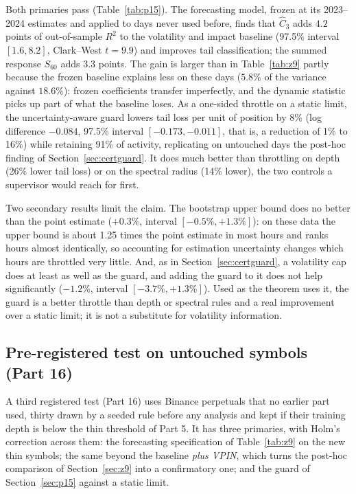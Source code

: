 Both primaries pass (Table~\ref{tab:p15}). The forecasting model, frozen at its 2023--2024 estimates and applied to days never used before, finds that $\hat C_3$ adds $4.2$ points of out-of-sample $R^2$ to the volatility and impact baseline (97.5\% interval $[1.6,8.2]$, Clark--West $t=9.9$) and improves tail classification; the summed response $S_{60}$ adds $3.3$ points. The gain is larger than in Table~\ref{tab:z9} partly because the frozen baseline explains less on these days ($5.8\%$ of the variance against $18.6\%$): frozen coefficients transfer imperfectly, and the dynamic statistic picks up part of what the baseline loses. As a one-sided throttle on a static limit, the uncertainty-aware guard lowers tail loss per unit of position by 8\% (log difference $-0.084$, 97.5\% interval $[-0.173,-0.011]$, that is, a reduction of 1\% to 16\%) while retaining 91\% of activity, replicating on untouched days the post-hoc finding of Section~\ref{sec:certguard}. It does much better than throttling on depth (26\% lower tail loss) or on the spectral radius (14\% lower), the two controls a supervisor would reach for first.

Two secondary results limit the claim. The bootstrap upper bound does no better than the point estimate ($+0.3\%$, interval $[-0.5\%,+1.3\%]$): on these data the upper bound is about 1.25 times the point estimate in most hours and ranks hours almost identically, so accounting for estimation uncertainty changes which hours are throttled very little. And, as in Section~\ref{sec:certguard}, a volatility cap does at least as well as the guard, and adding the guard to it does not help significantly ($-1.2\%$, interval $[-3.7\%,+1.3\%]$). Used as the theorem uses it, the guard is a better throttle than depth or spectral rules and a real improvement over a static limit; it is not a substitute for volatility information.

\subsection{Pre-registered test on untouched symbols (Part 16)}\label{sec:p16}
A third registered test (Part 16) uses Binance perpetuals that no earlier part used, thirty drawn by a seeded rule before any analysis and kept if their training depth is below the thin threshold of Part 5. It has three primaries, with Holm's correction across them: the forecasting specification of Table~\ref{tab:z9} on the new thin symbols; the same beyond the baseline \emph{plus VPIN}, which turns the post-hoc comparison of Section~\ref{sec:z9} into a confirmatory one; and the guard of Section~\ref{sec:p15} against a static limit.

